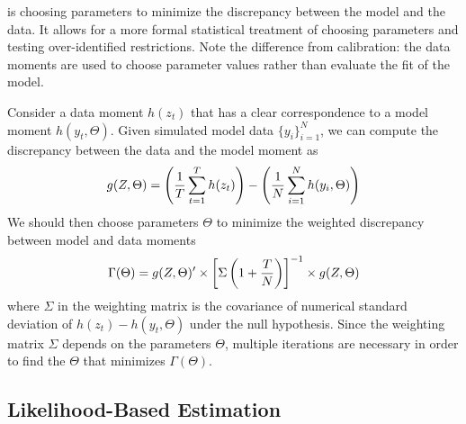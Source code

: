 \documentclass[10pt]{article}
\begin{document}
\begin{definition}
	 is choosing parameters to minimize the discrepancy between the model and the data. It allows for a more formal statistical treatment of choosing parameters and testing over-identified restrictions. Note the difference from calibration: the data moments are used to choose parameter values rather than evaluate the fit of the model.
\end{definition}

\begin{example}
	Consider a data moment $h(z_t)$ that has a clear correspondence to a model moment $h(y_t,\Theta)$. Given simulated model data $\{y_i\}_{i=1}^N$, we can compute the discrepancy between the data and the model moment as\[g(Z,\Theta) = \left( \frac{1}{T}\sum_{t=1}^T h(z_t)\right) - \left( \frac{1}{N}\sum_{i=1}^N h(y_i,\Theta)\right)\]We should then choose parameters $\Theta$ to minimize the weighted discrepancy between model and data moments \[\Gamma(\Theta) = g(Z,\Theta)'\times \left[ \Sigma \left( 1 + \frac{T}{N}\right)\right]^{-1} \times g(Z,\Theta)\]where $\Sigma$ in the weighting matrix is the covariance of numerical standard deviation of $h(z_t)-h(y_t,\Theta)$ under the null hypothesis. Since the weighting matrix $\Sigma$ depends on the parameters $\Theta$, multiple iterations are necessary in order to find the $\Theta$ that minimizes $\Gamma(\Theta)$. 
\end{example}

\subsection{Likelihood-Based Estimation}\label{subsec:12}
\end{document}
